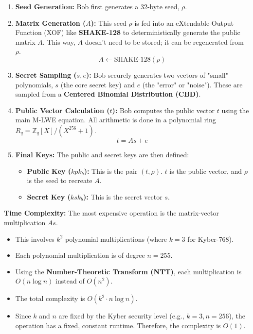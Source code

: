 \documentclass[12pt]{article}
\begin{document}
\begin{enumerate}
    \item \textbf{Seed Generation:} Bob first generates a 32-byte seed, $\rho$.
    \item \textbf{Matrix Generation ($A$):} This seed $\rho$ is fed into an eXtendable-Output Function (XOF) like \textbf{SHAKE-128} to deterministically generate the public matrix $A$. This way, $A$ doesn't need to be stored; it can be regenerated from $\rho$.
    \[
    A \leftarrow \text{SHAKE-128}(\rho)
    \]
    \item \textbf{Secret Sampling ($s, e$):} Bob securely generates two vectors of "small" polynomials, $s$ (the core secret key) and $e$ (the "error" or "noise"). These are sampled from a \textbf{Centered Binomial Distribution (CBD)}.
    \item \textbf{Public Vector Calculation ($t$):} Bob computes the public vector $t$ using the main M-LWE equation. All arithmetic is done in a polynomial ring $R_q = \mathbb{Z}_q[X] / (X^{256} + 1)$.
    \[
    t = A s + e
    \]
    \item \textbf{Final Keys:} The public and secret keys are then defined:
    \begin{itemize}
        \item \textbf{Public Key ($kpk_b$):} This is the pair $(t, \rho)$. $t$ is the public vector, and $\rho$ is the seed to recreate $A$.
        \item \textbf{Secret Key ($ksk_b$):} This is the secret vector $s$.
    \end{itemize}
\end{enumerate}

\textbf{Time Complexity:}
The most expensive operation is the matrix-vector multiplication $A s$.
\begin{itemize}
    \item This involves $k^2$ polynomial multiplications (where $k=3$ for Kyber-768).
    \item Each polynomial multiplication is of degree $n=255$.
    \item Using the \textbf{Number-Theoretic Transform (NTT)}, each multiplication is $O(n \log n)$ instead of $O(n^2)$.
    \item The total complexity is $O(k^2 \cdot n \log n)$.
    \item Since $k$ and $n$ are fixed by the Kyber security level (e.g., $k=3, n=256$), the operation has a fixed, constant runtime. Therefore, the complexity is \textbf{$O(1)$}.
\end{itemize}
\end{document}
